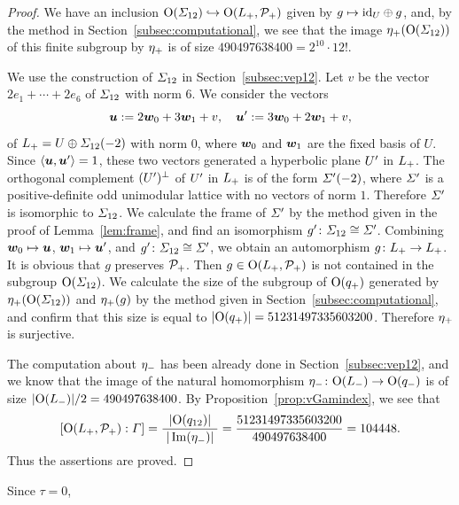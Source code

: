 \documentclass{amsart} %
\begin{document}
\begin{proof}
We have an inclusion $\mathord{\mathrm{O}}(\varSigma_{12})\hookrightarrow \mathord{\mathrm{O}}(L_{+}, \mathord{\mathcal{P}}_{+})$
given by $g\mapsto \mathord{\mathrm{id}}_{U}\oplus g$,
and, by the method in Section~\ref{subsec:computational}, 
we see that 
 the image ${\eta}_{+}(\mathord{\mathrm{O}}(\varSigma_{12}))$ of this finite subgroup %
by ${\eta}_{+}$ is 
of size $490497638400=2^{10}\cdot 12!$.
 \par
 We use the construction of $\varSigma_{12}$ in Section~\ref{subsec:vep12}.
 Let $v$ be the vector $2e_1+\cdots +2e_6$ of $\varSigma_{12}$ with norm $6$.
 We consider the vectors
 \[
 \boldsymbol{u}:=2\boldsymbol{w}_0+ 3\boldsymbol{w}_1+v,
 \quad 
 \boldsymbol{u}^{\prime}:=3\boldsymbol{w}_0+ 2\boldsymbol{w}_1+v,
 \]
 of $L_{+}=U\oplus \varSigma_{12}(-2)$ with norm $0$,
 where $\boldsymbol{w}_0$ and $\boldsymbol{w}_1$ are the fixed basis of $U$. 
Since 
$\langle \boldsymbol{u}, \boldsymbol{u}^{\prime} \rangle=1$, these two vectors 
generated a hyperbolic plane $U^{\prime}$ in $L_{+}$.
 The orthogonal complement $(U^{\prime})^{\perp}$ of $U^{\prime}$ in $L_{+}$
 is of the form $\varSigma^{\prime}(-2)$,
where $\varSigma^{\prime}$ is a positive-definite odd unimodular lattice
with no vectors of norm $1$.
Therefore $\varSigma^{\prime}$ is isomorphic to $\varSigma_{12}$.
We calculate the frame of $\varSigma^{\prime}$ 
by the method given in the proof of Lemma~\ref{lem:frame},
and find an isomorphism $g^{\prime} \colon \varSigma_{12}\cong \varSigma^{\prime}$.
Combining $\boldsymbol{w}_0\mapsto \boldsymbol{u}$, $\boldsymbol{w}_1\mapsto \boldsymbol{u}^{\prime}$,
and $g^{\prime} \colon \varSigma_{12}\cong \varSigma^{\prime}$,
we obtain an automorphism $g\colon L_{+}\to L_{+}$.
It is obvious that 
$g$ preserves $\mathord{\mathcal{P}}_{+}$.
Then $g\in \mathord{\mathrm{O}}(L_{+}, \mathord{\mathcal{P}}_{+})$
 is not contained in the subgroup $\mathord{\mathrm{O}}(\varSigma_{12})$.
We calculate the size of the subgroup of $\mathord{\mathrm{O}}(q_{+})$
generated by ${\eta}_{+}(\mathord{\mathrm{O}}(\varSigma_{12}))$ and ${\eta}_{+} (g)$
by the method given in Section~\ref{subsec:computational}, 
and confirm that 
this size is equal to $|\mathord{\mathrm{O}}(q_{+})|=51231497335603200$.
Therefore ${\eta}_{+}$ is surjective.
%
\par
The computation about ${\eta}_{-}$ has been already done in 
Section~\ref{subsec:vep12},
and we know that the image of 
the natural homomorphism 
${\eta}_{-}\colon \mathord{\mathrm{O}}(L_{-}) \to \mathord{\mathrm{O}}(q_{-})$
is of size 
$|\mathord{\mathrm{O}}(L_{-})|/2=490497638400$.
By Proposition~\ref{prop:vGamindex},
we see that 
\[
[\mathord{\mathrm{O}}(L_{+}, \mathord{\mathcal{P}}_{+}): \varGamma]
= \frac{ |\mathord{\mathrm{O}}(q_{12})|}{\; |\operatorname{Im}({\eta}_{-})|\;}
=
\frac{51231497335603200}{490497638400}
=
104448.
\]
Thus the assertions are proved.
\end{proof}
%
Since $\tau=0$,
\end{document}

